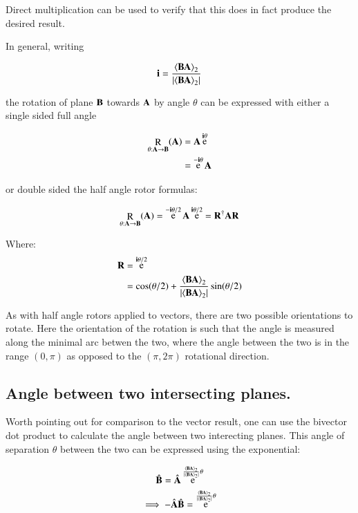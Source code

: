 \documentclass{article}      %
\DeclareMathOperator{\Exp}{e}
\DeclareMathOperator{\Rot}{R}
\newcommand{\gpgrade}[2] {{\left\langle{{#1}}\right\rangle}_{#2}}
\newcommand{\gpgradetwo}[1] {\gpgrade{#1}{2}}
\begin{document}
Direct multiplication can be used to verify that this does in fact produce the desired result.

In general, writing 

\[
\Bi = \frac{\gpgradetwo{\BB \BA}}{\abs{\gpgradetwo{\BB \BA}}}
\]

the rotation of plane $\mathbf{B}$ towards $\mathbf{A}$ by angle $\theta$ can be expressed with either a single sided full angle

\begin{align*}
\Rot_{\theta: \BA \rightarrow \BB}(\BA) 
&= \BA \Exp^{\Bi \theta} \\
&= \Exp^{-\Bi \theta} \BA \\
\end{align*}

or double sided the half angle rotor formulas:

\begin{equation}\label{eqn:rotor}
\Rot_{\theta: \BA \rightarrow \BB}(\BA) = \Exp^{-\Bi \theta/2} \BA \Exp^{\Bi \theta/2} = \BR^\dagger \BA \BR
\end{equation}

Where:
\begin{align*}
\BR 
&= \Exp^{\Bi\theta/2} \\
&= \cos(\theta/2) + \frac{\gpgradetwo{\BB \BA}}{\abs{\gpgradetwo{\BB \BA}}}\sin(\theta/2) \\
\end{align*}

As with half angle rotors applied to vectors, there are two possible orientations to rotate.  Here the orientation of the rotation is such that the angle is measured along the minimal arc betwen the two, where the angle between the two is in the range $(0,\pi)$ as opposed to the $(\pi,2\pi)$ rotational direction.

\subsection{ Angle between two intersecting planes. }

Worth pointing out for comparison to the vector result, one can use the bivector dot product to calculate the angle between two
interecting planes.
This angle of separation $\theta$ between the two can be expressed using the exponential:

\[
\hat{\BB} = \hat{\BA} \Exp^{ \frac{\gpgradetwo{\BB \BA}}{\abs{\gpgradetwo{\BB \BA}}} \theta}
\]
\[
\implies
-\hat{\BA} \hat{\BB} = \Exp^{ \frac{\gpgradetwo{\BB \BA}}{\abs{\gpgradetwo{\BB \BA}}} \theta}
\]
\end{document}
